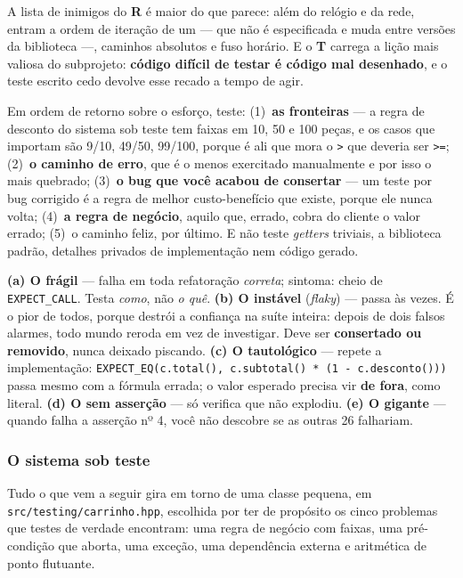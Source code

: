 A lista de inimigos do \textbf{R} é maior do que parece: além do relógio e da
rede, entram a ordem de iteração de um  --- que não é
especificada e muda entre versões da biblioteca ---, caminhos absolutos e fuso
horário. E o \textbf{T} carrega a lição mais valiosa do subprojeto:
\textbf{código difícil de testar é código mal desenhado}, e o teste escrito cedo
devolve esse recado a tempo de agir.

Em ordem de retorno sobre o esforço, teste: (1)~\textbf{as fronteiras} --- a
regra de desconto do sistema sob teste tem faixas em 10, 50 e 100 peças, e os
casos que importam são 9/10, 49/50, 99/100, porque é ali que mora o \texttt{>}
que deveria ser \texttt{>=}; (2)~\textbf{o caminho de erro}, que é o menos
exercitado manualmente e por isso o mais quebrado; (3)~\textbf{o bug que você
acabou de consertar} --- um teste por bug corrigido é a regra de melhor
custo-benefício que existe, porque ele nunca volta; (4)~\textbf{a regra de
negócio}, aquilo que, errado, cobra do cliente o valor errado; (5)~o caminho
feliz, por último. E não teste \emph{getters} triviais, a biblioteca padrão,
detalhes privados de implementação nem código gerado.

\begin{armadilha}
\textbf{(a) O frágil} --- falha em toda refatoração \emph{correta}; sintoma:
cheio de \texttt{EXPECT\_CALL}. Testa \emph{como}, não \emph{o quê}.
\textbf{(b) O instável} (\emph{flaky}) --- passa às vezes. É o pior de todos,
porque destrói a confiança na suíte inteira: depois de dois falsos alarmes, todo
mundo reroda em vez de investigar. Deve ser \textbf{consertado ou removido},
nunca deixado piscando.
\textbf{(c) O tautológico} --- repete a implementação:
\texttt{EXPECT\_EQ(c.total(), c.subtotal() * (1 - c.desconto()))} passa mesmo com
a fórmula errada; o valor esperado precisa vir \textbf{de fora}, como literal.
\textbf{(d) O sem asserção} --- só verifica que não explodiu.
\textbf{(e) O gigante} --- quando falha a asserção nº 4, você não descobre se as
outras 26 falhariam.
\end{armadilha}

\subsubsection{O sistema sob teste}

Tudo o que vem a seguir gira em torno de uma classe pequena, em
\texttt{src/testing/carrinho.hpp}, escolhida por ter de propósito os cinco
problemas que testes de verdade encontram: uma regra de negócio com faixas, uma
pré-condição que aborta, uma exceção, uma dependência externa e aritmética de
ponto flutuante.

